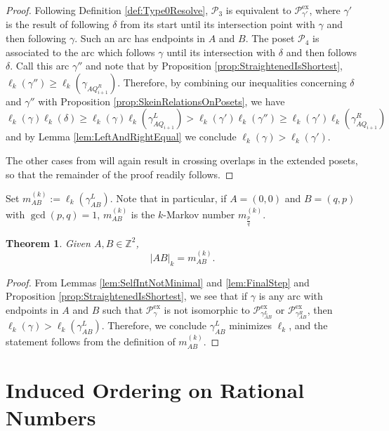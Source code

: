 \documentclass[12pt, letterpaper,table]{amsart}
\newtheorem{theorem}{Theorem}
\theoremstyle{remark}
\newcommand{\fpq}{\frac{p}{q}}
\newcommand{\calP}{\mathcal{P}}
\newcommand{\exx}{\mathrm{ex}}
\begin{document}
\begin{proof}
Following Definition \ref{def:Type0Resolve}, $\calP_3$ is equivalent to $\calP_{\gamma'}^\exx$, where $\gamma'$ is the result of following $\delta$ from its start until its intersection point with $\gamma$ and then following $\gamma$.  Such an arc has endpoints in $A$ and $B$. The poset $\calP_4$ is associated to the arc which follows  $\gamma$ until its intersection with $\delta$ and then follows $\delta$. Call this arc $\gamma''$  and note that by Proposition \ref{prop:StraightenedIsShortest}, $\ell_k(\gamma'') \geq \ell_k(  \gamma_{AQ_{i+1}^R})$. Therefore, by combining our inequalities concerning $\delta$ and $\gamma''$ with  Proposition \ref{prop:SkeinRelationsOnPosets}, we have \[
\ell_k(\gamma) \ell_k(\delta) \geq \ell_k(\gamma) \ell_k(\gamma_{AQ_{i+1}}^L) > \ell_k(\gamma') \ell_k(\gamma'') \geq  \ell_k(\gamma') \ell_k(\gamma_{AQ_{i+1}}^R) 
\]
and by Lemma \ref{lem:LeftAndRightEqual} we conclude $\ell_k(\gamma) > \ell_k(\gamma')$.



The other cases from \cite{LLRS} will again result in crossing overlaps in the extended posets, so that the remainder of the proof readily follows. 
\end{proof}

Set $m^{(k)}_{AB} := \ell_k(\gamma_{AB}^L)$. Note that in particular, if $A = (0,0)$ and $B = (q,p)$ with $\gcd(p,q) = 1$, $m^{(k)}_{AB}$ is the $k$-Markov number $m^{(k)}_{\fpq}$. 

\begin{theorem}\label{thm:LengthIsFromPoset}
Given $A,B \in \mathbb{Z}^2$, 
\[\vert AB\vert_k = m^{(k)}_{AB}.\]
\end{theorem}

\begin{proof}

From Lemmas \ref{lem:SelfIntNotMinimal} and \ref{lem:FinalStep} and Proposition \ref{prop:StraightenedIsShortest}, we see that if $\gamma$ is any arc with endpoints in $A$ and $B$ such that $\calP_\gamma^\exx$ is not isomorphic to $\calP_{\gamma_{AB}^L}^\exx$ or $\calP_{\gamma_{AB}^R}^\exx$, then $\ell_k(\gamma) > \ell_k(\gamma_{AB}^L)$. Therefore, we conclude $\gamma_{AB}^L$ minimizes $\ell_k$, and the statement follows from the definition of $m^{(k)}_{AB}$.
\end{proof}

\section{Induced Ordering on Rational Numbers}\label{sec:InducedOrdering}
\end{document}
